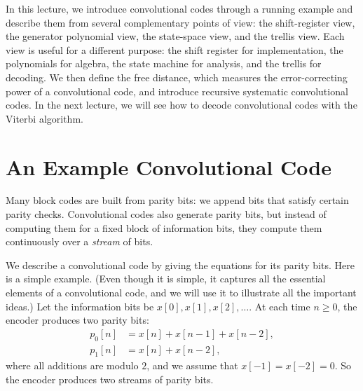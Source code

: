 In this lecture, we introduce convolutional codes through a running example and describe them from several complementary points of view: the shift-register view, the generator polynomial view, the state-space view, and the trellis view. Each view is useful for a different purpose: the shift register for implementation, the polynomials for algebra, the state machine for analysis, and the trellis for decoding. We then define the free distance, which measures the error-correcting power of a convolutional code, and introduce recursive systematic convolutional codes. In the next lecture, we will see how to decode convolutional codes with the Viterbi algorithm.

\section{An Example Convolutional Code}
Many block codes are built from parity bits: we append bits that satisfy certain parity checks. Convolutional codes also generate parity bits, but instead of computing them for a fixed block of information bits, they compute them continuously over a \emph{stream} of bits.

We describe a convolutional code by giving the equations for its parity bits. Here is a simple example. (Even though it is simple, it captures all the essential elements of a convolutional code, and we will use it to illustrate all the important ideas.) Let the information bits be \(x[0], x[1], x[2], \ldots\). At each time \(n \geq 0\), the encoder produces two parity bits:
\begin{align*}
p_0[n] &= x[n] + x[n-1] + x[n-2], \\
p_1[n] &= x[n] + x[n-2],
\end{align*}
where all additions are modulo \(2\), and we assume that \(x[-1] = x[-2] = 0\). So the encoder produces two streams of parity bits.

